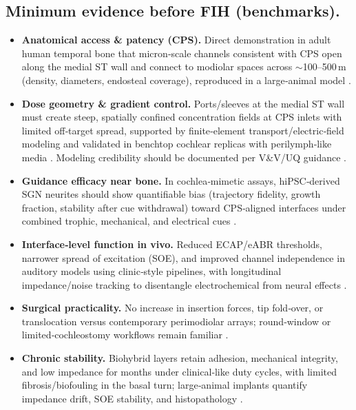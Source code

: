 \documentclass[referee,pdflatex, sn-vancouver-num]{sn-jnl}%
\theoremstyle{thmstyleone}%
\theoremstyle{thmstyletwo}%
\theoremstyle{thmstylethree}%
\begin{document}
\subsection{Minimum evidence before FIH (benchmarks).}
\begin{itemize}
  \item \textbf{Anatomical access \& patency (CPS).} Direct demonstration in adult human temporal bone that micron‑scale channels consistent with CPS{} open along the medial ST wall and connect to modiolar spaces across $\sim$100–500\,\textmu m (density, diameters, endosteal coverage), reproduced in a large‑animal model \cite{raskandersen2006,sando1971,masuda1971,lim1970,glueckert2008}.
  \item \textbf{Dose geometry \& gradient control.} Ports/sleeves at the medial ST wall must create steep, spatially confined concentration fields at CPS inlets with limited off‑target spread, supported by finite‑element transport/electric‑field modeling and validated in benchtop cochlear replicas with perilymph‑like media \cite{Micco2006,SaltPlontke2009,Nella2022NeurotrophinGradients}. Modeling credibility should be documented per V\&V/UQ guidance \cite{USFDA2021InSilico,ASMEVV40_2018}.
  \item \textbf{Guidance efficacy near bone.} In cochlea‑mimetic assays, hiPSC‑derived SGN neurites should show quantifiable bias (trajectory fidelity, growth fraction, stability after cue withdrawal) toward CPS‑aligned interfaces under combined trophic, mechanical, and electrical cues \cite{Kempfle2021,StPeter2022,Chang2020,Scheper2019,tan2012,CarnicerLombarte2024AdvMat}.
  \item \textbf{Interface‑level function in vivo.} Reduced ECAP/eABR thresholds, narrower spread of excitation (SOE), and improved channel independence in auditory models using clinic‑style pipelines, with longitudinal impedance/noise tracking to disentangle electrochemical from neural effects \cite{wilson2008,wilson2014,Micco2006,Rebscher2008}.
  \item \textbf{Surgical practicality.} No increase in insertion forces, tip fold‑over, or translocation versus contemporary perimodiolar arrays; round‑window or limited‑cochleostomy workflows remain familiar \cite{Rebscher2008,Sheykholeslami2002}.
  \item \textbf{Chronic stability.} Biohybrid layers retain adhesion, mechanical integrity, and low impedance for months under clinical‑like duty cycles, with limited fibrosis/biofouling in the basal turn; large‑animal implants quantify impedance drift, SOE stability, and histopathology \cite{Dalrymple2020,Horne2023,Green2012,Goding2017}.
\end{itemize}
\end{document}
